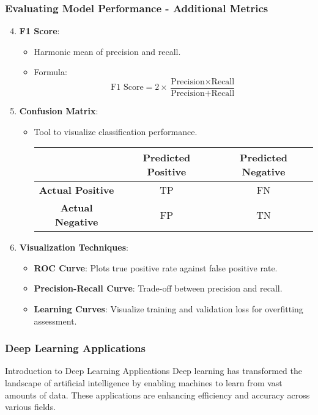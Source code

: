 \documentclass[aspectratio=169]{beamer}
\begin{document}
\begin{frame}[fragile]
    \frametitle{Evaluating Model Performance - Additional Metrics}
    \begin{enumerate}
        \setcounter{enumi}{3}
        \item \textbf{F1 Score}:
        \begin{itemize}
            \item Harmonic mean of precision and recall.
            \item Formula:
              \[
              \text{F1 Score} = 2 \times \frac{\text{Precision} \times \text{Recall}}{\text{Precision} + \text{Recall}}
              \]
        \end{itemize}

        \item \textbf{Confusion Matrix}:
        \begin{itemize}
            \item Tool to visualize classification performance.
            \begin{center}
            \begin{tabular}{|c|c|c|}
                \hline
                & \textbf{Predicted Positive} & \textbf{Predicted Negative} \\
                \hline
                \textbf{Actual Positive} & TP & FN \\
                \hline
                \textbf{Actual Negative} & FP & TN \\
                \hline
            \end{tabular}
            \end{center}
        \end{itemize}

        \item \textbf{Visualization Techniques}:
        \begin{itemize}
            \item \textbf{ROC Curve}: Plots true positive rate against false positive rate.
            \item \textbf{Precision-Recall Curve}: Trade-off between precision and recall.
            \item \textbf{Learning Curves}: Visualize training and validation loss for overfitting assessment.
        \end{itemize}
    \end{enumerate}
\end{frame}

\begin{frame}[fragile]
    \frametitle{Deep Learning Applications}
    \begin{block}{Introduction to Deep Learning Applications}
        Deep learning has transformed the landscape of artificial intelligence by enabling machines to learn from vast amounts of data. These applications are enhancing efficiency and accuracy across various fields.
    \end{block}
\end{frame}
\end{document}

